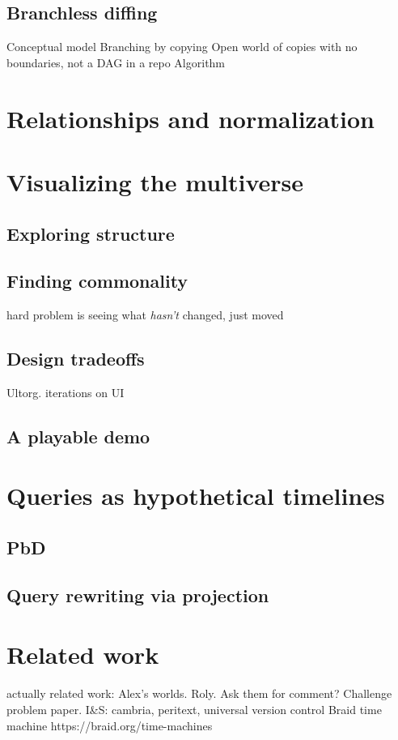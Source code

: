 \documentclass[english,submission]{programming}
\theoremstyle{definition}
\begin{document}
\subsection{Branchless diffing}
Conceptual model
Branching by copying
Open world of copies with no boundaries, not a DAG in a repo
Algorithm

\section{Relationships and normalization}

\section{Visualizing the multiverse}
\subsection{Exploring structure}
\subsection{Finding commonality}
hard problem is seeing what \textit{hasn't} changed, just moved
\subsection{Design tradeoffs}
Ultorg.
iterations on UI
\subsection{A playable demo}

\section{Queries as hypothetical timelines}
\subsection{PbD}
\subsection{Query rewriting via projection}


\section{Related work}

actually related work:
Alex's worlds. Roly. Ask them for comment?
Challenge problem paper.
I\&S: cambria, peritext, universal version control
Braid time machine https://braid.org/time-machines
\end{document}
